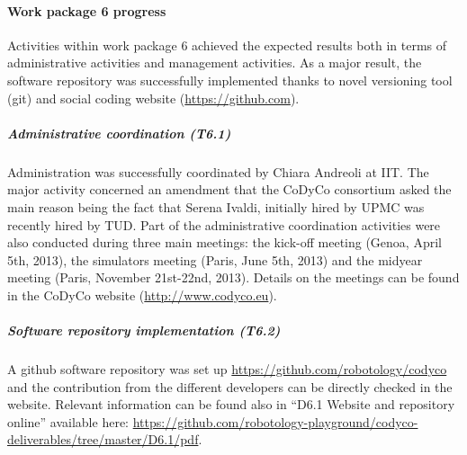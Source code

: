 

\paragraph{Work package 6 progress}

Activities within work package 6 achieved the expected results both in terms of administrative activities and management activities. As a major result, the software repository was successfully implemented thanks to novel versioning tool (git) and social coding website (\url{https://github.com}).

\subparagraph{Administrative coordination (T6.1)}
Administration was successfully coordinated by Chiara Andreoli at IIT. The major activity concerned an amendment that the CoDyCo consortium asked the main reason being the fact that Serena Ivaldi, initially hired by UPMC was recently hired by TUD. Part of the administrative coordination activities were also conducted during three main meetings: the kick-off meeting (Genoa, April 5th, 2013), the simulators meeting (Paris, June 5th, 2013) and the midyear meeting (Paris, November 21st-22nd, 2013). Details on the meetings can be found in the CoDyCo website (\url{http://www.codyco.eu}).

\subparagraph{Software repository implementation (T6.2)}

A github software repository was set up \url{https://github.com/robotology/codyco} and the contribution from the different developers can be directly checked in the website. Relevant information can be found also in ``D6.1 Website and repository online'' available here: \url{https://github.com/robotology-playground/codyco-deliverables/tree/master/D6.1/pdf}.
